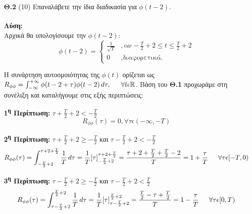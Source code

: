 \begin{justify}
{\bf  Θ.2} (10) Επαναλάβετε την ίδια διαδικασία για $\phi(t-2)$.\\\\
\textbf{Λύση:}\\
Αρχικά θα υπολογίσουμε την $\phi(t-2)$:
\[
    \phi(t-2) =
\left\{
	\begin{array}{ll}
		\frac{1}{\sqrt{T}} &, \mbox{αν} -\frac{T}{2}+2 \leq t \leq \frac{T}{2} + 2 \\
		0 &, \mbox{διαφορετικά.}
	\end{array}
\right.
\]
\end{justify}

\begin{justify}
H συνάρτηση αυτοομοιότητας της $\phi(t)$ ορίζεται ως $R_{\phi\phi}=\int_{-\infty}^{+\infty} \phi(t-2+\tau)\phi(t-2)\,d\tau, \hspace{1.5em} \forall t \epsilon \mathbb{R}$.\newline
Βάση του {\bf Θ.1} προχωράμε στη συνέλιξη και καταλήγουμε στις εξής περιπτώσεις:
\end{justify}

\begin{justify}
{\bf 1\textsuperscript{η} Περίπτωση:}  $\tau+\frac{T}{2}+2<-\frac{T}{2}$
\[
R_{\phi\phi}(\tau)=0, \forall \tau \epsilon (-\infty,-T)      
\]
\end{justify}

\begin{justify}
{\bf 2\textsuperscript{η} Περίπτωση:}  $\tau+\frac{T}{2}+2\geq-\frac{T}{2}$ και $\tau-\frac{T}{2}+2<-\frac{T}{2} $
\[
R_{\phi\phi}(\tau)=\int_{-\frac{T}{2}+2}^{\tau+2+\frac{T}{2}} \frac{1}{T}\,d\tau = 
\frac{1}{T}[\tau]_{-\frac{T}{2}+2}^{\tau+2+\frac{T}{2}} = \frac{\tau+2+\frac{T}{2}+\frac{T}{2}-2}{T}
=1+\frac{\tau}{T} \hspace{1.5em} \forall\tau\epsilon[-T,0)
\]
\end{justify}

\begin{justify}
{\bf 3\textsuperscript{η} Περίπτωση:}  $\tau-\frac{T}{2}+2\geq-\frac{T}{2}$ και $\tau-\frac{T}{2}+2<\frac{T}{2} $
\[
R_{\phi\phi}(\tau)=\int_{\tau-\frac{T}{2}+2}^{\frac{T}{2}+2} \frac{1}{T}\,d\tau = 
\frac{1}{T}[\tau]_{\tau-\frac{T}{2}+2}^{\frac{T}{2}+2} = \frac{\frac{T}{2}-\tau+\frac{T}{2}}{T}
=1-\frac{\tau}{T} \hspace{1.5em} \forall\tau\epsilon[0,T)
\]
\end{justify}

